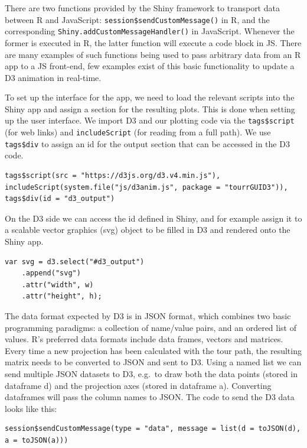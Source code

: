 There are two functions provided by the Shiny framework to transport
data between R and JavaScript: \texttt{session\$sendCustomMessage()} in
R, and the corresponding \texttt{Shiny.addCustomMessageHandler()} in
JavaScript. Whenever the former is executed in R, the latter function
will execute a code block in JS. There are many examples of such
functions being used to pass arbitrary data from an R app to a JS
front-end, few examples exist of this basic functionality to update a D3
animation in real-time.

To set up the interface for the app, we need to load the relevant
scripts into the Shiny app and assign a section for the resulting plots.
This is done when setting up the user interface. We import D3 and our
plotting code via the \texttt{tags\$script} (for web links) and
\texttt{includeScript} (for reading from a full path). We use
\texttt{tags\$div} to assign an id for the output section that can be
accessed in the D3 code.

\begin{verbatim}
tags$script(src = "https://d3js.org/d3.v4.min.js"),
includeScript(system.file("js/d3anim.js", package = "tourrGUID3")),
tags$div(id = "d3_output")
\end{verbatim}

On the D3 side we can access the id defined in Shiny, and for example
assign it to a scalable vector graphics (svg) object to be filled in D3
and rendered onto the Shiny app.

\begin{verbatim}
var svg = d3.select("#d3_output")
    .append("svg")
    .attr("width", w)
    .attr("height", h);
\end{verbatim}

The data format expected by D3 is in JSON format, which combines two
basic programming paradigms: a collection of name/value pairs, and an
ordered list of values. R's preferred data formats include data frames,
vectors and matrices. Every time a new projection has been calculated
with the tour path, the resulting matrix needs to be converted to JSON
and sent to D3. Using a named list we can send multiple JSON datasets to
D3, e.g.~to draw both the data points (stored in dataframe d) and the
projection axes (stored in dataframe a). Converting dataframes will pass
the column names to JSON. The code to send the D3 data looks like this:

\begin{verbatim}
session$sendCustomMessage(type = "data", message = list(d = toJSON(d), a = toJSON(a)))
\end{verbatim}

